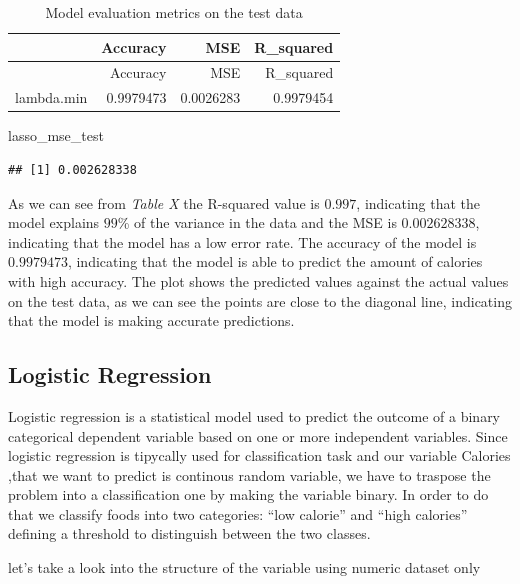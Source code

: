 \documentclass[
]{article}
\newenvironment{Shaded}{\begin{snugshade}}{\end{snugshade}}
\newcommand{\NormalTok}[1]{#1}
\begin{document}
\begin{longtable}[]{@{}lrrr@{}}
\caption{Model evaluation metrics on the test data}\tabularnewline
\toprule\noalign{}
& Accuracy & MSE & R\_squared \\
\midrule\noalign{}
\endfirsthead
\toprule\noalign{}
& Accuracy & MSE & R\_squared \\
\midrule\noalign{}
\endhead
\bottomrule\noalign{}
\endlastfoot
lambda.min & 0.9979473 & 0.0026283 & 0.9979454 \\
\end{longtable}

\begin{Shaded}
\begin{Highlighting}[]
\NormalTok{lasso\_mse\_test}
\end{Highlighting}
\end{Shaded}

\begin{verbatim}
## [1] 0.002628338
\end{verbatim}

As we can see from \emph{Table X} the R-squared value is \(0.997\),
indicating that the model explains \(99\)\% of the variance in the data
and the MSE is \(0.002628338\), indicating that the model has a low
error rate. The accuracy of the model is \(0.9979473\), indicating that
the model is able to predict the amount of calories with high accuracy.
The plot shows the predicted values against the actual values on the
test data, as we can see the points are close to the diagonal line,
indicating that the model is making accurate predictions.

\subsection{Logistic Regression}\label{logistic-regression}

Logistic regression is a statistical model used to predict the outcome
of a binary categorical dependent variable based on one or more
independent variables. Since logistic regression is tipycally used for
classification task and our variable Calories ,that we want to predict
is continous random variable, we have to traspose the problem into a
classification one by making the variable binary. In order to do that we
classify foods into two categories: ``low calorie'' and ``high
calories'' defining a threshold to distinguish between the two classes.

let's take a look into the structure of the variable using numeric
dataset only
\end{document}
